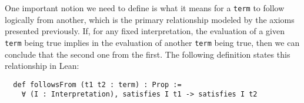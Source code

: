 One important notion we need to define is what it means for a \texttt{term}
to follow logically from another, which is the primary relationship modeled
by the axioms presented previously.
%
If, for any fixed interpretation, the evaluation of a given \texttt{term} being true
implies in the evaluation of another \texttt{term} being true, then we can conclude
that the second one from the first. The following definition states this relationship
in Lean:

\begin{verbatim}
  def followsFrom (t1 t2 : term) : Prop :=
    ∀ (I : Interpretation), satisfies I t1 -> satisfies I t2
\end{verbatim}
